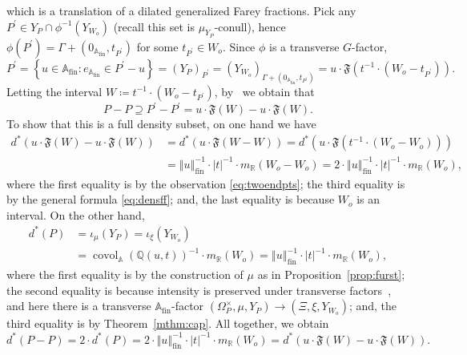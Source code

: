 \documentclass{amsart}
\numberwithin{equation}{subsection}
\theoremstyle{remark}
\begin{document}
which is a translation of a dilated generalized Farey fractions. Pick any \(P^{\prime}\in Y_{P}\cap\phi^{-1}\left(Y_{W_{o}}\right)\) (recall this set is \(\mu_{Y_{P}}\)-conull), hence \(\phi\left(P^{\prime}\right)=\Gamma+\left(0_{\mathbb{A}_{\mathrm{fin}}},t_{P^{\prime}}\right)\) for some \(t_{P^{\prime}}\in W_{o}\). Since \(\phi\) is a transverse \(G\)-factor,
\[P^{\prime}=\left\{ u\in\mathbb{A}_{\mathrm{fin}}:e_{\mathbb{A}_{\mathrm{fin}}}\in P^{\prime}-u\right\}=\left(Y_{P}\right)_{P^{\prime}}=\left(Y_{W_{o}}\right)_{\Gamma+\left(0_{\mathbb{A}_{\mathrm{fin}}},t_{P^{\prime}}\right)}=u\cdot\mathfrak{F}\left(t^{-1}\cdot\left(W_{o}-t_{P^{\prime}}\right)\right).\]
Letting the interval \(W\coloneqq t^{-1}\cdot\left(W_{o}-t_{P^{\prime}}\right)\), by~\cite[Lemma 2.4]{BjFi2024} we obtain that
\[P-P\supseteq P^{\prime}-P^{\prime}=u\cdot\mathfrak{F}\left(W\right)-u\cdot\mathfrak{F}\left(W\right).\]
To show that this is a full density subset, on one hand we have
\begin{align*}
d^{\ast}\left(u\cdot\mathfrak{F}\left(W\right)-u\cdot\mathfrak{F}\left(W\right)\right)
&=d^{\ast}\left(u\cdot\mathfrak{F}\left(W-W\right)\right)=d^{\ast}\left(u\cdot\mathfrak{F}\left(t^{-1}\cdot\left(W_{o}-W_{o}\right)\right)\right)\\
&=\left\Vert u\right\Vert _{\mathrm{fin}}^{-1}\cdot\left|t\right|^{-1}\cdot m_{\mathbb{R}}\left(W_{o}-W_{o}\right)=2\cdot\left\Vert u\right\Vert _{\mathrm{fin}}^{-1}\cdot\left|t\right|^{-1}\cdot m_{\mathbb{R}}\left(W_{o}\right),
\end{align*}
where the first equality is by the observation \eqref{eq:twoendpts}; the third equality is by the general formula \eqref{eq:densff}; and, the last equality is because \(W_{o}\) is an interval. On the other hand,
\begin{align*}
d^{\ast}\left(P\right)	
&=\iota_{\mu}\left(Y_{P}\right)=\iota_{\xi}\left(Y_{W_{o}}\right)\\
&=\operatorname{covol}_{\mathbb{A}}\left(\mathbb{Q}\left(u,t\right)\right)^{-1}\cdot m_{\mathbb{R}}\left(W_{o}\right)=\left\Vert u\right\Vert _{\mathrm{fin}}^{-1}\cdot\left|t\right|^{-1}\cdot m_{\mathbb{R}}\left(W_{o}\right),
\end{align*}
where the first equality is by the construction of \(\mu\) as in Proposition~\ref{prop:furst}; the second equality is because intensity is preserved under transverse factors~\cite[Proposition 5.10]{AvBjCuI}, and here there is a transverse \(\mathbb{A}_{\mathrm{fin}}\)-factor \(\left(\Omega_{P}^{\times},\mu,Y_{P}\right)\to\left(\Xi,\xi,Y_{W_{o}}\right)\); and, the third equality is by Theorem~\ref{mthm:cap}. All together, we obtain
\[d^{\ast}\left(P-P\right)=2\cdot d^{\ast}\left(P\right)=2\cdot\left\Vert u\right\Vert _{\mathrm{fin}}^{-1}\cdot\left|t\right|^{-1}\cdot m_{\mathbb{R}}\left(W_{o}\right)=d^{\ast}\left(u\cdot\mathfrak{F}\left(W\right)-u\cdot\mathfrak{F}\left(W\right)\right).\]
\end{document}
